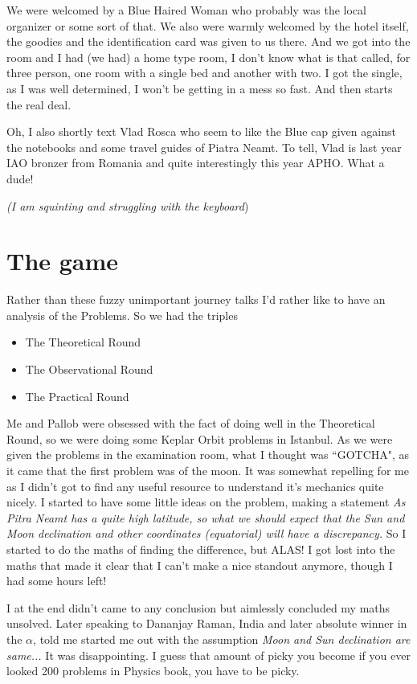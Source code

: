 \documentclass[11pt,a4paper]{article}
\begin{document}
We were welcomed by a Blue Haired Woman who probably was the local organizer or some sort of that. We also were warmly welcomed by the hotel itself, the goodies and the identification card was given to us there. And we got into the room and I had (we had) a home type room, I don't know what is that called, for three person, one room with a single bed and another with two. I got the single, as I was well determined, I won't be getting in a mess so fast. And then starts the real deal.

Oh, I also shortly text Vlad Rosca who seem to like the Blue cap given against the notebooks and some travel guides of Piatra Neamt. To tell, Vlad is last year IAO bronzer from Romania and quite interestingly this year APHO. What a dude!

\emph{(I am squinting and struggling with the keyboard})

\section{The game}
Rather than these fuzzy unimportant journey talks I'd rather like to have an analysis of the Problems. So we had the triples
\begin{itemize}
\item The Theoretical Round
\item The Observational Round
\item The Practical Round
\end{itemize}
Me and Pallob were obsessed with the fact of doing well in the Theoretical Round, so we were doing some Keplar Orbit problems in Istanbul. As we were given the problems in the examination room, what I thought was ``GOTCHA", as it came that the first problem was of the moon. It was somewhat repelling for me as I didn't got to find any useful resource to understand it's mechanics quite nicely. I started to have some little ideas on the problem, making a statement \emph{As Pitra Neamt has a quite high latitude, so what we should expect that the Sun and Moon declination and other coordinates (equatorial) will have a discrepancy.} So I started to do the maths of finding the difference, but ALAS! I got lost into the maths that made it clear that I can't make a nice standout anymore, though I had some hours left!

I at the end didn't came to any conclusion but aimlessly concluded my maths unsolved. Later speaking to Dananjay Raman, India and later absolute winner in the $\alpha$, told me started me out with the assumption \emph{Moon and Sun declination are same...} It was disappointing. I guess that amount of picky you become if you ever looked 200 problems in Physics book, you have to be picky.  
\end{document}
